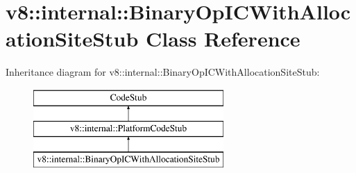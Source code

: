 \hypertarget{classv8_1_1internal_1_1_binary_op_i_c_with_allocation_site_stub}{}\section{v8\+:\+:internal\+:\+:Binary\+Op\+I\+C\+With\+Allocation\+Site\+Stub Class Reference}
\label{classv8_1_1internal_1_1_binary_op_i_c_with_allocation_site_stub}
Inheritance diagram for v8\+:\+:internal\+:\+:Binary\+Op\+I\+C\+With\+Allocation\+Site\+Stub\+:\begin{figure}[H]
\begin{center}
\leavevmode
\includegraphics[height=3.000000cm]{classv8_1_1internal_1_1_binary_op_i_c_with_allocation_site_stub}
\end{center}
\end{figure}
